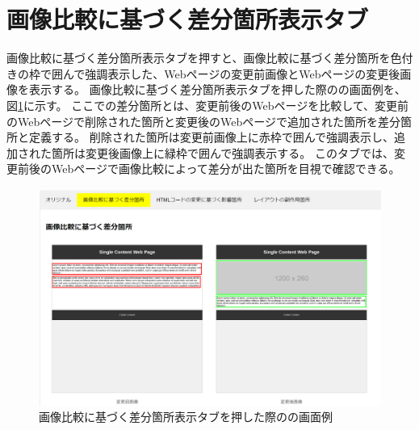\section{画像比較に基づく差分箇所表示タブ}\label{subsec:images_tab}
画像比較に基づく差分箇所表示タブを押すと、画像比較に基づく差分箇所を色付きの枠で囲んで強調表示した、Webページの変更前画像とWebページの変更後画像を表示する。
画像比較に基づく差分箇所表示タブを押した際の\toolName の画面例を、図\ref{fig: Appearance_images_tab}に示す。
ここでの差分箇所とは、変更前後のWebページを比較して、変更前のWebページで削除された箇所と変更後のWebページで追加された箇所を差分箇所と定義する。
削除された箇所は変更前画像上に赤枠で囲んで強調表示し、追加された箇所は変更後画像上に緑枠で囲んで強調表示する。
このタブでは、変更前後のWebページで画像比較によって差分が出た箇所を目視で確認できる。
\begin{figure}[tp]
    \begin{center}
        \includegraphics[width=1.0\columnwidth]{image/3_images_tab.png}
        \caption{画像比較に基づく差分箇所表示タブを押した際の\toolName の画面例}
        \label{fig: Appearance_images_tab}
    \end{center}
\end{figure}



